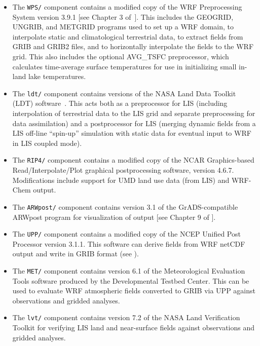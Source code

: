 \begin{itemize}
\item The \texttt{WPS/} component contains a modified copy of the WRF 
  Preprocessing System version 3.9.1 [see Chapter 3 
  of~\cite{ref:ArwUserGuide}]. This includes the GEOGRID, UNGRIB, and METGRID 
  programs used to set up a WRF domain, to interpolate static and 
  climatological terrestrial data, to extract fields from GRIB and GRIB2 
  files, and to horizontally interpolate the fields to the WRF grid. This also
  includes the optional AVG\_TSFC preprocessor, which calculates time-average
  surface temperatures for use in initializing small in-land lake temperatures.

\item The \texttt{ldt/} component contains versions of the NASA Land 
  Data Toolkit (LDT) software~\citep{ref:LdtUserGuide}.  This acts both as a 
  preprocessor for LIS (including interpolation of terrestrial data to the LIS
  grid and separate preprocessing for data assimilation) and a postprocessor 
  for LIS (merging dynamic fields from a LIS off-line ``spin-up'' simulation 
  with static data for eventual input to WRF in LIS coupled mode).

\item The \texttt{RIP4/} component contains a modified copy of the NCAR 
  Graphics-based Read/Interpolate/Plot \citep{ref:RipUserGuide} graphical 
  postprocessing software, version 4.6.7. Modifications include support
  for UMD land use data (from LIS) and WRF-Chem output.

\item The \texttt{ARWpost/} component contains version 3.1 of the 
  GrADS-compatible ARWpost program for visualization of output [see Chapter 9 
  of \cite{ref:ArwUserGuide}].

\item The \texttt{UPP/} component contains a modified copy of the NCEP Unified 
  Post Processor version 3.1.1. This software can derive fields from WRF netCDF 
  output and write in GRIB format (see \cite{ref:UppUserGuide}).

\item The \texttt{MET/} component contains version 6.1 of the Meteorological 
  Evaluation Tools \citep{ref:MetUserGuide} software produced by the 
  Developmental Testbed Center. This can be used to evaluate WRF atmospheric 
  fields converted to GRIB via UPP against observations and gridded analyses.

\item The \texttt{lvt/} component contains version 7.2 of the NASA Land 
  Verification Toolkit \citep{ref:LvtUserGuide} for verifying LIS land and 
  near-surface fields against observations and gridded analyses.


\end{itemize}
